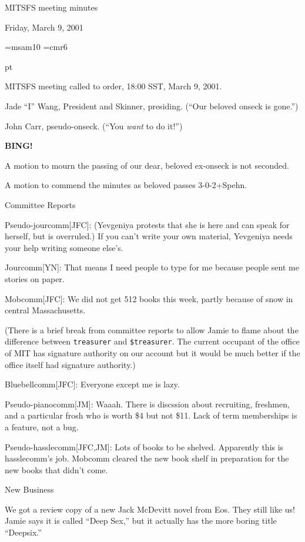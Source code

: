 \centerline{MITSFS meeting minutes}
\centerline{Friday, March 9, 2001}

\font\sym=msam10
\font\small=cmr6

 pt

MITSFS meeting called to order, 18:00 SST, March 9, 2001.

Jade ``I'' Wang, President and Skinner, presiding.
(``Our beloved onseck is gone.'')

John Carr, pseudo-onseck.  (``You {\it want} to do it!'')

{\bf BING!}

\vskip 12pt

A motion to mourn the passing of our dear, beloved ex-onseck is not seconded.

A motion to commend the minutes as beloved passes \hbox{3-0-2+{\small Spehn}}.

\vskip 12pt

\centerline{Committee Reports}

\vskip 12pt

Pseudo-jourcomm[JFC]: (Yevgeniya protests that she is here and can speak for
herself, but is overruled.) If you can't write your own material, Yevgeniya
needs your help writing someone else's.

Jourcomm[YN]: That means I need people to type for me because people sent
me stories on paper.

Mobcomm[JFC]: We did not get 512 books this week, partly because of snow in
central Massachusetts.

(There is a brief break from committee reports to allow Jamie to
flame about the difference between {\tt treasurer} and {\tt \$treasurer}.
The current occupant of the office of MIT has signature authority on our
account but it would be much better if the office itself had signature
authority.)

Bluebellcomm[JFC]: Everyone except me is lazy.

Pseudo-pianocomm[JM]: Waaah.  There is discssion about recruiting,
freshmen, and a particular frosh who is worth \$4 but not \$11.
Lack of term memberships is a feature, not a bug.

Pseudo-hasslecomm[JFC,JM]: Lots of books to be shelved.  Apparently
this is hasslecomm's job.  Mobcomm cleared the new book shelf in
preparation for the new books that didn't come.


\vskip 12pt

\centerline{New Business}

\vskip 12pt
We got a review copy of a new Jack McDevitt novel from Eos.  They still
like us!  Jamie says it is called ``Deep Sex,'' but it actually has the
more boring title ``Deepsix.''

